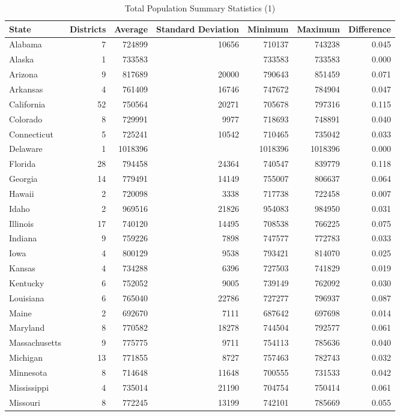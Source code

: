 \documentclass[12pt]{article}
\begin{document}
\begin{table}[ht!]
	\centering
	\begin{adjustbox}{max width=\textwidth}
	\begin{tabular}{lrrrrrr}
	  \hline
	 State & Districts & Average  & Standard Deviation & Minimum & Maximum & Difference \\ 
	  \hline
	 Alabama & 7 & 724899 & 10656 & 710137 & 743238 & 0.045 \\ 
	   Alaska & 1 & 733583 &  & 733583 & 733583 & 0.000 \\ 
	  Arizona & 9 & 817689 & 20000 & 790643 & 851459 & 0.071 \\ 
	   Arkansas & 4 & 761409 & 16746 & 747672 & 784904 & 0.047 \\ 
	   California & 52 & 750564 & 20271 & 705678 & 797316 & 0.115 \\ 
	   Colorado & 8 & 729991 & 9977 & 718693 & 748891 & 0.040 \\ 
	  Connecticut & 5 & 725241 & 10542 & 710465 & 735042 & 0.033 \\ 
	  Delaware & 1 & 1018396 &  & 1018396 & 1018396 & 0.000 \\ 
	  Florida & 28 & 794458 & 24364 & 740547 & 839779 & 0.118 \\ 
	   Georgia & 14 & 779491 & 14149 & 755007 & 806637 & 0.064 \\ 
	   Hawaii & 2 & 720098 & 3338 & 717738 & 722458 & 0.007 \\ 
	   Idaho & 2 & 969516 & 21826 & 954083 & 984950 & 0.031 \\ 
	   Illinois & 17 & 740120 & 14495 & 708538 & 766225 & 0.075 \\ 
	  Indiana & 9 & 759226 & 7898 & 747577 & 772783 & 0.033 \\ 
	   Iowa & 4 & 800129 & 9538 & 793421 & 814070 & 0.025 \\ 
	   Kansas & 4 & 734288 & 6396 & 727503 & 741829 & 0.019 \\ 
	   Kentucky & 6 & 752052 & 9005 & 739149 & 762092 & 0.030 \\ 
	  Louisiana & 6 & 765040 & 22786 & 727277 & 796937 & 0.087 \\ 
	   Maine & 2 & 692670 & 7111 & 687642 & 697698 & 0.014 \\ 
	 Maryland & 8 & 770582 & 18278 & 744504 & 792577 & 0.061 \\ 
	   Massachusetts & 9 & 775775 & 9711 & 754113 & 785636 & 0.040 \\ 
	   Michigan & 13 & 771855 & 8727 & 757463 & 782743 & 0.032 \\ 
	 Minnesota & 8 & 714648 & 11648 & 700555 & 731533 & 0.042 \\ 
	 Mississippi & 4 & 735014 & 21190 & 704754 & 750414 & 0.061 \\ 
	 Missouri & 8 & 772245 & 13199 & 742101 & 785669 & 0.055 \\ 
	   
	   \hline
	\end{tabular}
	\end{adjustbox}
	\label{total_pop_stats1}
	\caption{Total Population Summary Statistics (1)}
	\end{table}
\end{document}
